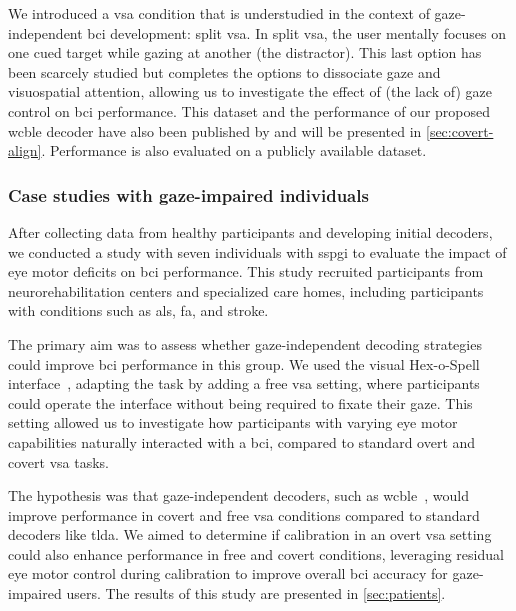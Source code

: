 We introduced a \ac{vsa} condition that is understudied in the context of
gaze-independent \ac{bci} development: split \ac{vsa}.
In split \ac{vsa}, the user mentally focuses on one cued target while gazing at
another (the distractor).
This last option has been scarcely studied but completes
the options to dissociate gaze and visuospatial attention, allowing us to
investigate the effect of (the lack of) gaze control on \ac{bci} performance.
This dataset and the performance of our proposed \ac{wcble} decoder have also been
published by \textcite{VanDenKerchove2024} and will be presented in
\cref{sec:covert-align}.
Performance is also evaluated on a publicly available dataset.

\subsubsection{Case studies with gaze-impaired individuals}
\label{sec:patients/approach/casestudies}

After collecting data from healthy participants and developing initial decoders, we conducted
a study with seven individuals with \ac{sspgi} to evaluate the impact of eye motor deficits
on \ac{bci} performance.
This study recruited participants from neurorehabilitation centers
and specialized care homes, including participants with conditions such as \ac{als}, \ac{fa},
and stroke.

The primary aim was to assess whether gaze-independent decoding strategies could improve
\ac{bci} performance in this group.
We used the visual Hex-o-Spell interface~\cite{Treder2010}, adapting the task by adding a
free \ac{vsa} setting, where participants could operate the interface without being required
to fixate their gaze.
This setting allowed us to investigate how participants with varying eye motor capabilities
naturally interacted with a \ac{bci}, compared to standard overt and covert \ac{vsa} tasks.

The hypothesis was that gaze-independent decoders, such as \ac{wcble}~\cite{VanDenKerchove2024},
would improve performance in covert and free \ac{vsa} conditions compared to standard
decoders like \ac{tlda}.
We aimed to determine if calibration in an overt \ac{vsa} setting could also enhance
performance in free and covert conditions, leveraging residual eye motor control during
calibration to improve overall \ac{bci} accuracy for gaze-impaired users.
The results of this study are presented in \cref{sec:patients}.
